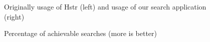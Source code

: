 \begin{figure}
\centering
{}\hfill
{}
\caption{Percentage of achievable searches (more is better)}
\small{Originally usage of Hstr (left) and usage of our search application (right)}
\label{eval-metrics-plot-dist-1-cmds}
\end{figure}


